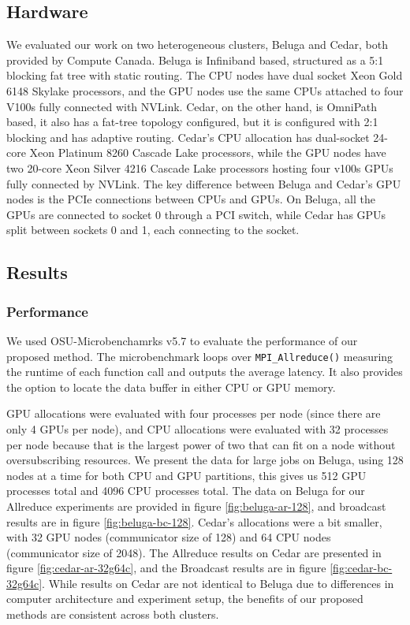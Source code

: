 

\subsection{Hardware}\label{sec:topo-eval-hardware}
We evaluated our work on two heterogeneous clusters, Beluga and Cedar, both provided by Compute Canada. 
Beluga is Infiniband based, structured as a 5:1 blocking fat tree with static routing.  
The CPU nodes have dual socket Xeon Gold 6148 Skylake processors, and the GPU nodes use the same CPUs attached to four V100s fully connected with NVLink.
Cedar, on the other hand, is OmniPath based, it also has a fat-tree topology configured, but it is configured with 2:1 blocking and has adaptive routing.
Cedar's CPU allocation has dual-socket 24-core Xeon Platinum 8260 Cascade Lake processors, while the GPU nodes have two 20-core Xeon Silver 4216 Cascade Lake processors hosting four v100s GPUs fully connected by NVLink.
The key difference between Beluga and Cedar's GPU nodes is the PCIe connections between CPUs and GPUs.
On Beluga, all the GPUs are connected to socket 0 through a PCI switch, while Cedar has GPUs split between sockets 0 and 1, each connecting to the socket.

\subsection{Results}

\subsubsection{Performance}

We used OSU-Microbenchamrks v5.7 \cite{Bureddy2012OMB} to evaluate the performance of our proposed method. 
The microbenchmark loops over \texttt{MPI\_Allreduce()} measuring the runtime of each function call and outputs the average latency. 
It also provides the option to locate the data buffer in either CPU or GPU memory.

GPU allocations were evaluated with four processes per node (since there are only 4 GPUs per node), and CPU allocations were evaluated with 32 processes per node because that is the largest power of two that can fit on a node without oversubscribing resources.
We present the data for large jobs on Beluga, using 128 nodes at a time for both CPU and GPU partitions, this gives us 512 GPU processes total and 4096 CPU processes total.
The data on Beluga for our Allreduce experiments are provided in figure \ref{fig:beluga-ar-128}, and broadcast results are in figure \ref{fig:beluga-bc-128}.
Cedar's allocations were a bit smaller, with 32 GPU nodes (communicator size of 128) and 64 CPU nodes (communicator size of 2048).
The Allreduce results on Cedar are presented in figure \ref{fig:cedar-ar-32g64c}, and the Broadcast results are in figure \ref{fig:cedar-bc-32g64c}.
While results on Cedar are not identical to Beluga due to differences in computer architecture and experiment setup, the benefits of our proposed methods are consistent across both clusters.

